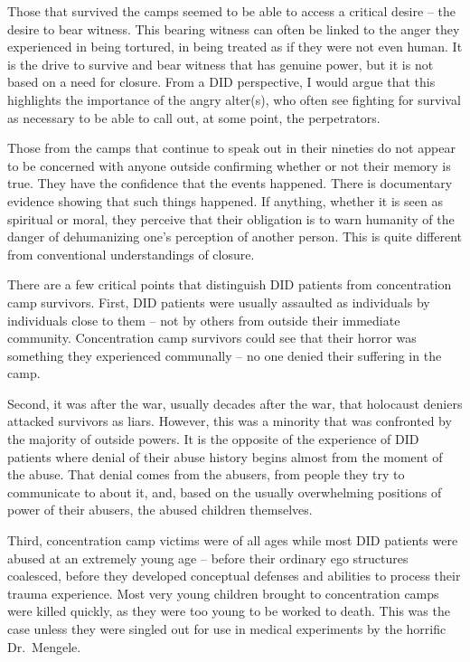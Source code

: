 \documentclass[]{book}
\begin{document}
Those that survived the camps seemed to be able to access a critical desire -- the desire to bear witness. This bearing witness can often be linked to the anger they experienced in being tortured, in being treated as if they were not even human. It is the drive to survive and bear witness that has genuine power, but it is not based on a need for closure. From a DID perspective, I would argue that this highlights the importance of the angry alter(s), who often see fighting for survival as necessary to be able to call out, at some point, the perpetrators.

Those from the camps that continue to speak out in their nineties do not appear to be concerned with anyone outside confirming whether or not their memory is true. They have the confidence that the events happened. There is documentary evidence showing that such things happened. If anything, whether it is seen as spiritual or moral, they perceive that their obligation is to warn humanity of the danger of dehumanizing one's perception of another person. This is quite different from conventional understandings of closure.

There are a few critical points that distinguish DID patients from concentration camp survivors. First, DID patients were usually assaulted as individuals by individuals close to them -- not by others from outside their immediate community. Concentration camp survivors could see that their horror was something they experienced communally -- no one denied their suffering in the camp.

Second, it was after the war, usually decades after the war, that holocaust deniers attacked survivors as liars. However, this was a minority that was confronted by the majority of outside powers. It is the opposite of the experience of DID patients where denial of their abuse history begins almost from the moment of the abuse. That denial comes from the abusers, from people they try to communicate to about it, and, based on the usually overwhelming positions of power of their abusers, the abused children themselves.

Third, concentration camp victims were of all ages while most DID patients were abused at an extremely young age -- before their ordinary ego structures coalesced, before they developed conceptual defenses and abilities to process their trauma experience. Most very young children brought to concentration camps were killed quickly, as they were too young to be worked to death. This was the case unless they were singled out for use in medical experiments by the horrific Dr.~Mengele.
\end{document}
